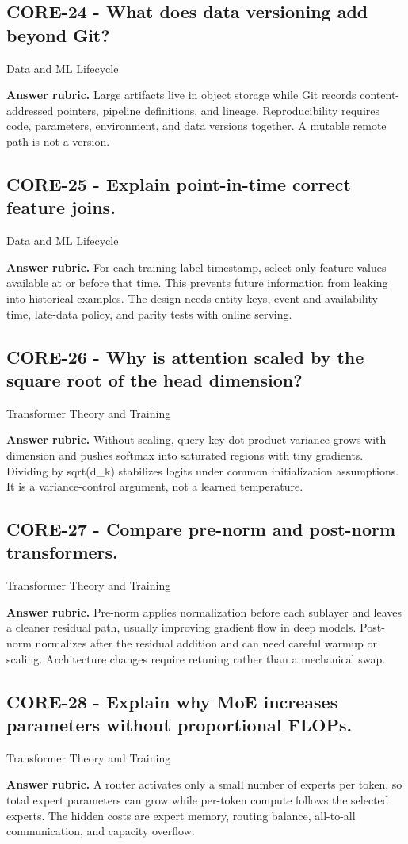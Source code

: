 \subsection*{CORE-24 - What does data versioning add beyond Git?}
 \quad Data and ML Lifecycle
\par\smallskip\textbf{Answer rubric.} Large artifacts live in object storage while Git records content-addressed pointers, pipeline definitions, and lineage. Reproducibility requires code, parameters, environment, and data versions together. A mutable remote path is not a version.
\subsection*{CORE-25 - Explain point-in-time correct feature joins.}
 \quad Data and ML Lifecycle
\par\smallskip\textbf{Answer rubric.} For each training label timestamp, select only feature values available at or before that time. This prevents future information from leaking into historical examples. The design needs entity keys, event and availability time, late-data policy, and parity tests with online serving.
\subsection*{CORE-26 - Why is attention scaled by the square root of the head dimension?}
 \quad Transformer Theory and Training
\par\smallskip\textbf{Answer rubric.} Without scaling, query-key dot-product variance grows with dimension and pushes softmax into saturated regions with tiny gradients. Dividing by sqrt(d\_k) stabilizes logits under common initialization assumptions. It is a variance-control argument, not a learned temperature.
\subsection*{CORE-27 - Compare pre-norm and post-norm transformers.}
 \quad Transformer Theory and Training
\par\smallskip\textbf{Answer rubric.} Pre-norm applies normalization before each sublayer and leaves a cleaner residual path, usually improving gradient flow in deep models. Post-norm normalizes after the residual addition and can need careful warmup or scaling. Architecture changes require retuning rather than a mechanical swap.
\subsection*{CORE-28 - Explain why MoE increases parameters without proportional FLOPs.}
 \quad Transformer Theory and Training
\par\smallskip\textbf{Answer rubric.} A router activates only a small number of experts per token, so total expert parameters can grow while per-token compute follows the selected experts. The hidden costs are expert memory, routing balance, all-to-all communication, and capacity overflow.
